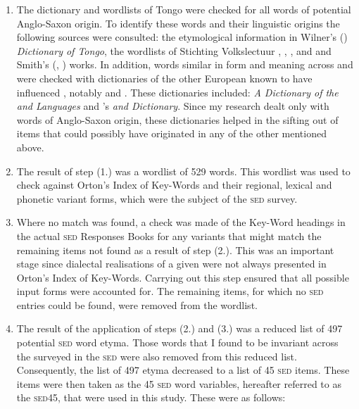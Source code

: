 \begin{enumerate}
\item{ The dictionary and wordlists of  Tongo were checked for all words of potential Anglo-Saxon origin. To identify these words and their linguistic origins the following sources were consulted: the etymological information in Wilner's (\citeyear{Wilner07, Wilner03, Wilner92}) \emph{Dictionary of  Tongo}, the  wordlists of Stichting Volkslectuur \citep{Stichting80}, \citet{Schumann83}, \citet{Fermin69}, and \citet{Herlein18} and Smith's (\citeyear*{Smith08}, \citeyear*{Smith87})  works. In addition, words similar in form and meaning across  and  were checked with dictionaries of the other European  known to have influenced , notably  and . These dictionaries included: \citet{Vieyra60}  \emph{A Dictionary of the  and  Languages} and  \citet{Holtrop23} 's \emph{ and  Dictionary}. Since my research dealt only with words of Anglo-Saxon origin, these dictionaries helped in the sifting out of items that could possibly have originated in any of the other  mentioned above.}
\item{The result of step (1.) was a wordlist of 529 words. This wordlist was used to check against Orton's Index of Key-Words \citep{Orton62} and their regional, lexical and phonetic variant forms, which were the subject of the \textsc{sed} survey.}
\item{Where no match was found, a check was made of the Key-Word headings in the actual \textsc{sed} Responses Books \citep{Orton6271} for any variants that might match the remaining items not found as a result of step (2.). This was an important stage since dialectal realisations of a given  were not always presented in Orton's Index of Key-Words. Carrying out this step ensured that all possible input forms were accounted for. The remaining items, for which no \textsc{sed} entries could be found, were removed from the wordlist.}
\item{The result of the application of steps (2.) and (3.) was a reduced list of 497 potential \textsc{sed} word etyma. Those words that I found to be invariant across the   surveyed in the \textsc{sed} were also removed from this reduced list. Consequently, the list of 497  etyma decreased to a list of 45 \textsc{sed} items. These items were then taken as the 45 \textsc{sed} word variables, hereafter referred to as the \textsc{sed45}, that were used in this study. These were as follows:

}
\end{enumerate}

